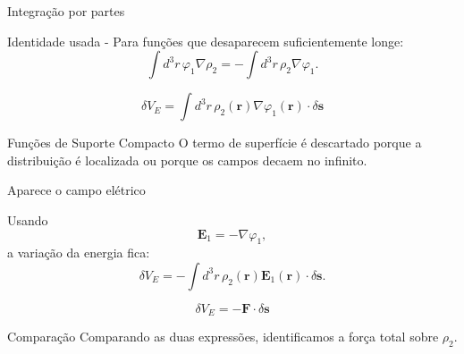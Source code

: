 \documentclass[aspectratio=169,11pt]{beamer}
\begin{document}
\begin{frame}{Integração por partes}

\begin{mybox}{Identidade usada - }
Para funções que desaparecem suficientemente longe:
\[
\int d^3r\,\varphi_1\nabla\rho_2
=
-\int d^3r\,\rho_2\nabla\varphi_1.
\]
\end{mybox}

\begin{eqbox}
\begin{equation}
\delta V_E
=
\int d^3r\,
\rho_2(\mathbf r)
\nabla\varphi_1(\mathbf r)\cdot\delta\mathbf{s}
\tag{3.68}
\end{equation}
\end{eqbox}

\begin{alertblock}{Funções de Suporte Compacto}
O termo de superfície é descartado porque a distribuição é localizada ou porque os campos decaem no infinito.
\end{alertblock}

\end{frame}

\begin{frame}{Aparece o campo elétrico}

\begin{mybox}{Usando}
\[
\mathbf E_1 = -\nabla\varphi_1,
\]
a variação da energia fica:
\[
\delta V_E
=
-\int d^3r\,
\rho_2(\mathbf r)\mathbf E_1(\mathbf r)\cdot\delta\mathbf{s}.
\]
\end{mybox}

\begin{eqbox}
\begin{equation}
\delta V_E
=
-\mathbf F\cdot\delta\mathbf{s}
\end{equation}
\end{eqbox}

\begin{alertblock}{Comparação}
Comparando as duas expressões, identificamos a força total sobre \(\rho_2\).
\end{alertblock}

\end{frame}
\end{document}
